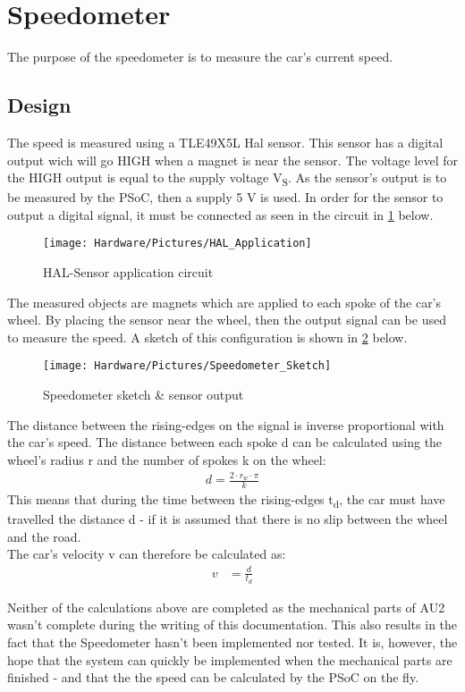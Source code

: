 \newpage
\section{Speedometer}
The purpose of the speedometer is to measure the car's current speed.

\subsection{Design}
The speed is measured using a TLE49X5L Hal sensor\cite{TLE4905}. This sensor has a digital output wich will go HIGH when a magnet is near the sensor. The voltage level for the HIGH output is equal to the supply voltage V\textsubscript{S}. As the sensor's output is to be measured by the PSoC, then a supply 5 V is used.
In order for the sensor to output a digital signal, it must be connected as seen in the circuit in \ref{fig:HAL_application} below.

\begin{figure}[H]
	\centering
	\texttt{[image: Hardware/Pictures/HAL\_Application]}
	\caption{HAL-Sensor application circuit}
	\label{fig:HAL_application}
\end{figure}

The measured objects are magnets  which are applied to each spoke of the car's wheel. By placing the sensor near the wheel, then the output signal can be used to measure the speed. A sketch of this configuration is shown in \ref{fig:Speed_sketch} below.

\begin{figure}[H]
	\centering
	\texttt{[image: Hardware/Pictures/Speedometer\_Sketch]}
	\caption{Speedometer sketch \& sensor output}
	\label{fig:Speed_sketch}
\end{figure}

\newpage
The distance between the rising-edges on the signal is inverse proportional with the car's speed. The distance between each spoke d can be calculated using the wheel's radius r and the number of spokes k on the wheel:
\begin{align}
		d = \frac{2 \cdot r_w \cdot \pi}{k}
\end{align}
This means that during the time between the rising-edges t\textsubscript{d}, the car must have travelled the distance d - if it is assumed that there is no slip between the wheel and the road.\\
The car's velocity v can therefore be calculated as:
\begin{align}
		v &= \frac{d}{t_d}
\end{align}

Neither of the calculations above are completed as the mechanical parts of AU2 wasn't complete during the writing of this documentation. This also results in the fact that the Speedometer hasn't been implemented nor tested. It is, however, the hope that the system can quickly be implemented when the mechanical parts are finished - and that the the speed can be calculated by the PSoC on the fly. 